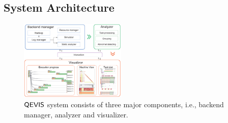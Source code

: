 \subsection{System Architecture}
\begin{figure}[t]
	\centering
	\includegraphics[width=0.45\textwidth]{figures/system/sysdesign.pdf}
	\vspace{-3mm}
	\caption{$\mathsf{QEVIS}$ system consists of three major components, i.e., backend manager, analyzer and visualizer.}
	\label{fig:sysdesign}
	\vspace{-3mm}
\end{figure}
%
%
%
%
%
%


